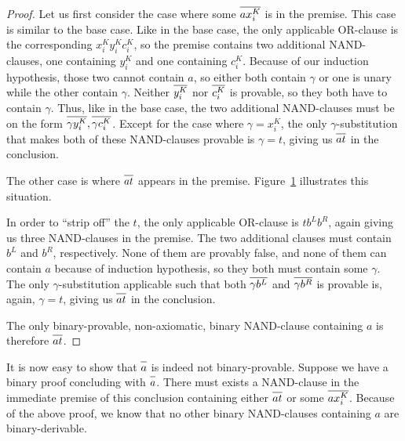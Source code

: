 \begin{proof}
Let us first consider the case where some $\ol{ax^K_i}$ is in the premise.
This case is similar to the base case.
Like in the base case, the only applicable OR-clause is the corresponding $x^K_iy^K_ic^K_i$, so the premise contains two additional NAND-clauses, one containing $y^K_i$ and one containing $c^K_i$.
Because of our induction hypothesis, those two cannot contain $a$, so either both contain $\gamma$ or one is unary while the other contain $\gamma$.
Neither $\ol{y^K_i}$ nor $\ol{c^K_i}$ is provable, so they both have to contain $\gamma$.
Thus, like in the base case, the two additional NAND-clauses must be on the form $\ol{\gamma y^K_i},\ol{\gamma c^K_i}$.
Except for the case where $\gamma = x^K_i$, the only $\gamma$-substitution that makes both of these NAND-clauses provable is $\gamma = t$, giving us $\ol{at}$ in the conclusion.

The other case is where $\ol{at}$ appears in the premise.
Figure~\ref{fig:nand_inductive_step} illustrates this situation.\par
\begin{figure}[!h]
  \centering
  \begin{prooftree*}
    \Hypo{\dots}
    \Hypo{\dots}
    \Hypo{\dots}
  \end{prooftree*}
  \caption{}
  \label{fig:nand_inductive_step}
\end{figure}
In order to ``strip off'' the $t$, the only applicable OR-clause is $tb^Lb^R$, again giving us three NAND-clauses in the premise.
The two additional clauses must contain $b^L$ and $b^R$, respectively.
None of them are provably false, and none of them can contain $a$ because of induction hypothesis, so they both must contain some $\gamma$.
The only $\gamma$-substitution applicable such that both $\ol{\gamma b^L}$ and $\ol{\gamma b^R}$ is provable is, again, $\gamma = t$, giving us $\ol{at}$ in the conclusion.

The only binary-provable, non-axiomatic, binary NAND-clause containing $a$ is therefore $\ol{at}$.
\end{proof}

It is now easy to show that $\ol{a}$ is indeed not binary-provable.
Suppose we have a binary proof concluding with $\ol{a}$.
There must exists a NAND-clause in the immediate premise of this conclusion containing either $\ol{at}$ or some $\ol{ax^K_i}$.
Because of the above proof, we know that no other binary NAND-clauses containing $a$ are binary-derivable.

